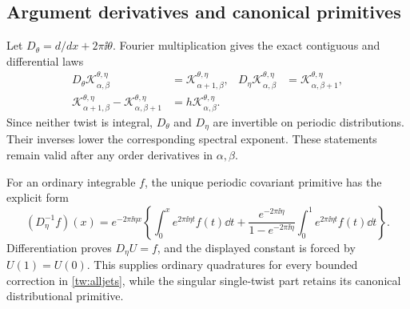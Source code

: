 \subsection{Argument derivatives and canonical primitives}

Let $D_\theta=d/dx+2\pi\ii\theta$. Fourier multiplication gives
the exact contiguous and differential laws
\begin{align}
 D_\theta\mathcal K_{\alpha,\beta}^{\theta,\eta}
   &=\mathcal K_{\alpha+1,\beta}^{\theta,\eta},&
 D_\eta\mathcal K_{\alpha,\beta}^{\theta,\eta}
   &=\mathcal K_{\alpha,\beta+1}^{\theta,\eta},\label{tw:diff}\\
 \mathcal K_{\alpha+1,\beta}^{\theta,\eta}
  -\mathcal K_{\alpha,\beta+1}^{\theta,\eta}
   &=h\mathcal K_{\alpha,\beta}^{\theta,\eta}.
 \label{tw:contiguous}
\end{align}
Since neither twist is integral, $D_\theta$ and $D_\eta$ are
invertible on periodic distributions. Their inverses lower the
corresponding spectral exponent. These statements remain valid after
any order derivatives in $\alpha,\beta$.

For an ordinary integrable $f$, the unique periodic covariant primitive
has the explicit form
\begin{equation}
 (D_\eta^{-1}f)(x)=e^{-2\pi\ii\eta x}
 \left\{\int_0^x e^{2\pi\ii\eta t}f(t)\dd t
   +\frac{e^{-2\pi\ii\eta}}{1-e^{-2\pi\ii\eta}}
          \int_0^1e^{2\pi\ii\eta t}f(t)\dd t\right\}.
 \label{tw:primitive}
\end{equation}
Differentiation proves $D_\eta U=f$, and the displayed constant is
forced by $U(1)=U(0)$. This supplies ordinary quadratures for every
bounded correction in \eqref{tw:alljets}, while the singular
single-twist part retains its canonical distributional primitive.

